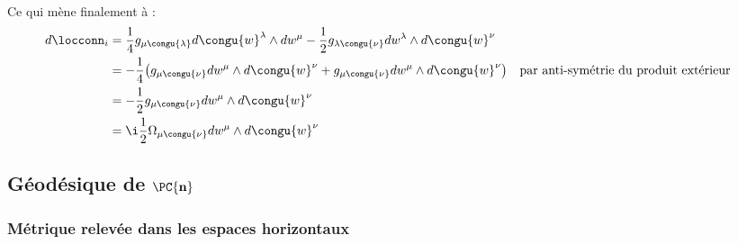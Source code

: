 \\
Ce qui mène finalement à :
\begin{align*}
	d\locconn_i &= \frac{1}{4} g_{\mu \congu{\lambda}} d\congu{w}^\lambda \wedge dw^\mu  - \frac{1}{2} g_{\lambda \congu{\nu}} dw^\lambda \wedge d\congu{w}^\nu \\
	&= -\frac{1}{4} \big( g_{\mu \congu{\nu}} dw^\mu \wedge d\congu{w}^\nu  + g_{\mu \congu{\nu}} dw^\mu \wedge d\congu{w}^\nu \big)  &  &\text{par anti-symétrie du produit extérieur}\\
	&= - \frac{1}{2} g_{\mu \congu{\nu}} dw^\mu \wedge d\congu{w}^\nu \\
	&= \i \frac{1}{2} \Omega_{\mu \congu{\nu}} dw^\mu \wedge d\congu{w}^\nu
\end{align*}
\skipl







\subsection{Géodésique de $\bf{\PC{n}}$} \label{ann:geode2PC^n}


\subsubsection{Métrique relevée dans les espaces horizontaux}

